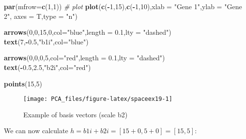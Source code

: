\documentclass[
]{book}
\newenvironment{Shaded}{\begin{snugshade}}{\end{snugshade}}
\newcommand{\CommentTok}[1]{\textcolor[rgb]{0.56,0.35,0.01}{\textit{#1}}}
\newcommand{\DataTypeTok}[1]{\textcolor[rgb]{0.13,0.29,0.53}{#1}}
\newcommand{\DecValTok}[1]{\textcolor[rgb]{0.00,0.00,0.81}{#1}}
\newcommand{\FloatTok}[1]{\textcolor[rgb]{0.00,0.00,0.81}{#1}}
\newcommand{\KeywordTok}[1]{\textcolor[rgb]{0.13,0.29,0.53}{\textbf{#1}}}
\newcommand{\NormalTok}[1]{#1}
\newcommand{\OperatorTok}[1]{\textcolor[rgb]{0.81,0.36,0.00}{\textbf{#1}}}
\newcommand{\StringTok}[1]{\textcolor[rgb]{0.31,0.60,0.02}{#1}}
\theoremstyle{definition}
\theoremstyle{definition}
\theoremstyle{definition}
\theoremstyle{remark}
\begin{document}
\begin{Shaded}
\begin{Highlighting}[]
\KeywordTok{par}\NormalTok{(}\DataTypeTok{mfrow=}\KeywordTok{c}\NormalTok{(}\DecValTok{1}\NormalTok{,}\DecValTok{1}\NormalTok{))}
\CommentTok{# plot}
\KeywordTok{plot}\NormalTok{(}\KeywordTok{c}\NormalTok{(}\OperatorTok{-}\DecValTok{1}\NormalTok{,}\DecValTok{15}\NormalTok{),}\KeywordTok{c}\NormalTok{(}\OperatorTok{-}\DecValTok{1}\NormalTok{,}\DecValTok{10}\NormalTok{),}\DataTypeTok{xlab =} \StringTok{"Gene 1"}\NormalTok{,}\DataTypeTok{ylab =} \StringTok{"Gene 2"}\NormalTok{,}
 \DataTypeTok{axes =}\NormalTok{ T,}\DataTypeTok{type =} \StringTok{"n"}\NormalTok{)}

\KeywordTok{arrows}\NormalTok{(}\DecValTok{0}\NormalTok{,}\DecValTok{0}\NormalTok{,}\DecValTok{15}\NormalTok{,}\DecValTok{0}\NormalTok{,}\DataTypeTok{col=}\StringTok{"blue"}\NormalTok{,}\DataTypeTok{length =} \FloatTok{0.1}\NormalTok{,}\DataTypeTok{lty =} \StringTok{"dashed"}\NormalTok{)}
\KeywordTok{text}\NormalTok{(}\DecValTok{7}\NormalTok{,}\OperatorTok{-}\FloatTok{0.5}\NormalTok{,}\StringTok{"b1i"}\NormalTok{,}\DataTypeTok{col=}\StringTok{"blue"}\NormalTok{)}

\KeywordTok{arrows}\NormalTok{(}\DecValTok{0}\NormalTok{,}\DecValTok{0}\NormalTok{,}\DecValTok{0}\NormalTok{,}\DecValTok{5}\NormalTok{,}\DataTypeTok{col=}\StringTok{"red"}\NormalTok{,}\DataTypeTok{length =} \FloatTok{0.1}\NormalTok{,}\DataTypeTok{lty =} \StringTok{"dashed"}\NormalTok{)}
\KeywordTok{text}\NormalTok{(}\OperatorTok{-}\FloatTok{0.5}\NormalTok{,}\FloatTok{2.5}\NormalTok{,}\StringTok{"b2i"}\NormalTok{,}\DataTypeTok{col=}\StringTok{"red"}\NormalTok{)}

\KeywordTok{points}\NormalTok{(}\DecValTok{15}\NormalTok{,}\DecValTok{5}\NormalTok{)}
\end{Highlighting}
\end{Shaded}

\begin{figure}

{\centering \texttt{[image: PCA\_files/figure-latex/spaceex19-1]} 

}

\caption{Example of basis vectors (scale b2)}\label{fig:spaceex19}
\end{figure}

We can now calculate \(h=b1i+b2i=[15+0,5+0]=[15,5]\):
\end{document}
